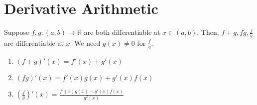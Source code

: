 \documentclass[12pt]{article}
\begin{document}
\section{Derivative Arithmetic}
\begin{theo}{}
Suppose \(f,g: (a, b) \to \mathbb R\) are both differentiable at \(x \in (a, b)\). Then, \(f + g, fg, \frac{f}{g}\) are differentiable at \(x\). We need \(g(x) \neq 0\) for \(\frac{f}{g}\).\\
\begin{enumerate}
    \item \((f+g)'(x) = f'(x) + g'(x)\)
    \item \((fg)'(x) = f'(x)g(x) + g'(x)f(x)\)
    \item \(\left(\frac{f}{g}\right)'(x) = \frac{f'(x)g(x) - g'(x)f(x)}{g^2(x)}\) \\
\end{enumerate}    
\end{theo}
\newpage
\end{document}
